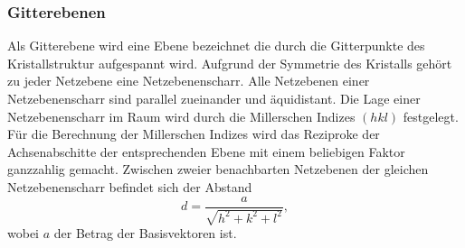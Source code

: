 \subsubsection{Gitterebenen}
\label{sec:miller}
Als Gitterebene wird eine Ebene bezeichnet die durch die Gitterpunkte des Kristallstruktur aufgespannt wird.
Aufgrund der Symmetrie des Kristalls gehört zu jeder Netzebene eine Netzebenenscharr.
Alle Netzebenen einer Netzebenenscharr sind parallel zueinander und äquidistant.
Die Lage einer Netzebenenscharr im Raum wird durch die Millerschen Indizes $(hkl)$ festgelegt.
Für die Berechnung der Millerschen Indizes wird das Reziproke der Achsenabschitte der entsprechenden Ebene mit einem beliebigen Faktor ganzzahlig gemacht.
Zwischen zweier benachbarten Netzebenen der gleichen Netzebenenscharr befindet sich der Abstand
\begin{equation}
  d=\frac{a}{\sqrt{h^2+k^2+l^2}},
  \label{eq:d}
\end{equation}
wobei $a$ der Betrag der Basisvektoren ist.


